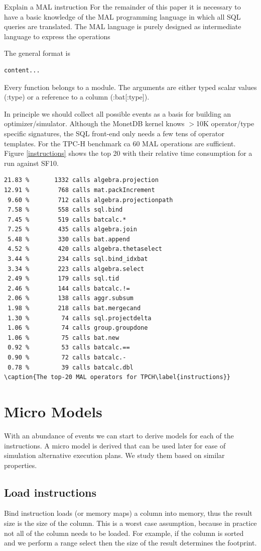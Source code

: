\documentclass[conference]{IEEEtran}
\begin{document}
Explain a MAL instruction
For the remainder of this paper it is necessary to have a basic knowledge of the MAL programming language in which all SQL queries are translated. The MAL language is purely designed as intermediate language to express the operations 

The general format is
\begin{verbatim}
content...
\end{verbatim}
Every function belongs to a module. The arguments are either typed scalar values (:type) or a reference to a column (:bat[:type]).

In principle we should collect all possible events as a basis for building an optimizer/simulator. Although the MonetDB kernel knows $>$10K operator/type specific signatures, the SQL front-end only needs a few tens of operator templates.
For the TPC-H benchmark  ca 60 MAL operations are sufficient. Figure \ref{instructions} shows the top 20 with their relative time consumption for a run against SF10.

{\tiny\begin{verbatim} 
21.83 %       1332 calls algebra.projection
12.91 %        768 calls mat.packIncrement
 9.60 %        712 calls algebra.projectionpath
 7.58 %        558 calls sql.bind
 7.45 %        519 calls batcalc.*
 7.25 %        435 calls algebra.join
 5.48 %        330 calls bat.append
 4.52 %        420 calls algebra.thetaselect
 3.44 %        234 calls sql.bind_idxbat
 3.34 %        223 calls algebra.select
 2.49 %        179 calls sql.tid
 2.46 %        144 calls batcalc.!=
 2.06 %        138 calls aggr.subsum
 1.98 %        218 calls bat.mergecand
 1.30 %         74 calls sql.projectdelta
 1.06 %         74 calls group.groupdone
 1.06 %         75 calls bat.new
 0.92 %         53 calls batcalc.==
 0.90 %         72 calls batcalc.-
 0.78 %         39 calls batcalc.dbl
\caption{The top-20 MAL operators for TPCH\label{instructions}}
\end{verbatim}
}
\section{Micro Models}
With an abundance of events we can start to derive models for each of the instructions. A micro model is derived that can be used later for ease of simulation alternative execution plans. We study them based on similar properties.

\subsection{Load instructions}
Bind instruction loads (or memory maps) a column into memory,
thus the result size is the size of the column. This is a worst case assumption,
because in practice not all of the column needs to be loaded. For example,
if the column is sorted and we perform a range select then the size of the result
determines the footprint.
\end{document}
